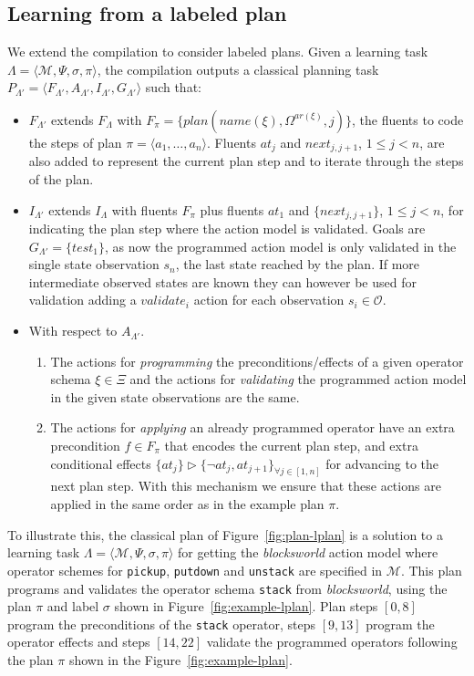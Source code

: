 \documentclass[3p,times]{elsarticle}
\newcommand{\tup}[1]{{\langle #1 \rangle}}
\begin{document}
\subsection{Learning from a labeled plan}
We extend the compilation to consider labeled plans. Given a learning task $\Lambda=\tup{\mathcal{M},\Psi,\sigma,\pi}$, the compilation outputs a classical planning task $P_{\Lambda'}=\tup{F_{\Lambda'},A_{\Lambda'},I_{\Lambda'},G_{\Lambda'}}$ such that:
\begin{itemize}
\item $F_{\Lambda'}$ extends $F_{\Lambda}$ with $F_{\pi}=\{plan(name(\xi),\Omega^{ar(\xi)},j)\}$, the fluents to code the steps of plan $\pi=\tup{a_1, \ldots, a_n}$. Fluents $at_j$ and $next_{j,j+1}$, {\small $1\leq j< n$}, are also added to represent the current plan step and to iterate through the steps of the plan.
\item $I_{\Lambda'}$ extends $I_{\Lambda}$ with fluents $F_{\pi}$ plus fluents $at_1$ and $\{next_{j,j+1}\}$, {\small $1\leq j<n$}, for indicating the plan step where the action model is validated. Goals are $G_{\Lambda'}=\{test_1\}$, as now the programmed action model is only validated in the single state observation $s_n$, the last state reached by the plan. If more intermediate observed states are known they can however be used for validation adding a $validate_{i}$ action for each observation $s_{i}\in \mathcal{O}$.
\item With respect to $A_{\Lambda'}$.
\begin{enumerate}
\item The actions for {\em programming} the preconditions/effects of a given operator schema $\xi\in\Xi$ and the actions for {\em validating} the programmed action model in the given state observations are the same.
\item The actions for {\em applying} an already programmed operator have an extra precondition $f\in F_{\pi}$ that encodes the current plan step, and extra conditional effects $\{at_{j}\}\rhd\{\neg at_{j},at_{j+1}\}_{\forall j\in [1,n]}$ for advancing to the next plan step. With this mechanism we ensure that these actions are applied in the same order as in the example plan $\pi$.
\end{enumerate}
\end{itemize}

To illustrate this, the classical plan of Figure~\ref{fig:plan-lplan} is a solution to a learning task $\Lambda=\tup{\mathcal{M},\Psi,\sigma,\pi}$ for getting the {\em blocksworld} action model where operator schemes for {\tt\small pickup}, {\tt\small putdown} and {\tt\small unstack} are specified in $\mathcal{M}$. This plan programs and validates the operator schema {\tt\small stack} from {\em blocksworld}, using the plan $\pi$ and label $\sigma$ shown in Figure~\ref{fig:example-lplan}. Plan steps $[0,8]$ program the preconditions of the {\tt\small stack} operator, steps $[9,13]$ program the operator effects and steps $[14,22]$ validate the programmed operators following the plan $\pi$ shown in the Figure~\ref{fig:example-lplan}.
\end{document}
